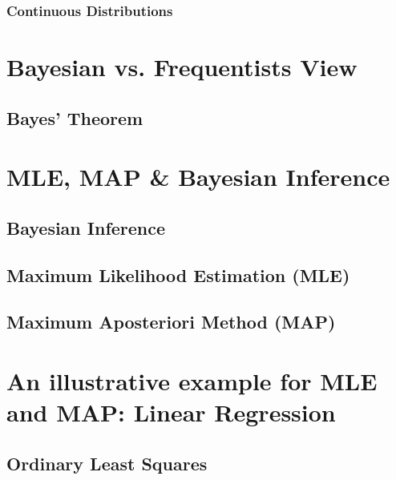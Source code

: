 \documentclass[letterpaper,10pt,english]{jupyterBook}
\begin{document}
\subsection{Continuous Distributions}
\label{\detokenize{fund/fundprob:continuous-distributions}}

\chapter{Bayesian vs. Frequentists View}
\label{\detokenize{fund/stat:bayesian-vs-frequentists-view}}\label{\detokenize{fund/stat::doc}}

\section{Bayes’ Theorem}
\label{\detokenize{fund/stat:bayes-theorem}}

\chapter{MLE, MAP \& Bayesian Inference}
\label{\detokenize{fund/bayes:mle-map-bayesian-inference}}\label{\detokenize{fund/bayes::doc}}

\section{Bayesian Inference}
\label{\detokenize{fund/bayes:bayesian-inference}}

\section{Maximum Likelihood Estimation (MLE)}
\label{\detokenize{fund/bayes:maximum-likelihood-estimation-mle}}

\section{Maximum A\sphinxhyphen{}posteriori Method (MAP)}
\label{\detokenize{fund/bayes:maximum-a-posteriori-method-map}}

\chapter{An illustrative example for MLE and MAP: Linear Regression}
\label{\detokenize{fund/linregr:an-illustrative-example-for-mle-and-map-linear-regression}}\label{\detokenize{fund/linregr::doc}}

\section{Ordinary Least Squares}
\label{\detokenize{fund/linregr:ordinary-least-squares}}
\end{document}
